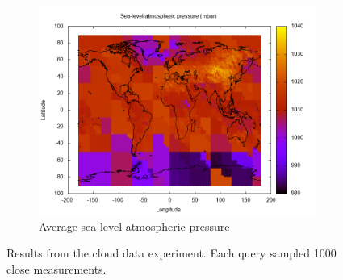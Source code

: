 \begin{figure}[H]
\centering
\ContinuedFloat
\begin{subfigure}[b]{1.0\textwidth}
	\includegraphics[width=\textwidth]{img/cloud/pressure}
	\caption{Average sea-level atmospheric pressure}
\end{subfigure}
\caption{Results from the cloud data experiment.
	Each query sampled 1000 close measurements.}
\end{figure}
